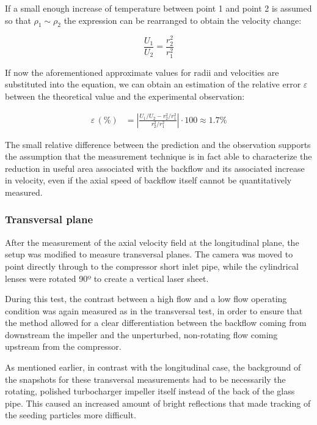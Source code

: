 If a small enough increase of temperature between point 1 and point 2 is assumed so that $\rho_1\sim\rho_2$ the expression can be rearranged to obtain the velocity change:

\begin{equation}
  \frac{U_1}{U_2} = \frac{r_2^2}{r_1^2}
\end{equation}

If now the aforementioned approximate values for radii and velocities are substituted into the equation, we can obtain an estimation of the relative error $\varepsilon$ between the theoretical value and the experimental observation:

\begin{align}
  \varepsilon\, (\%) &= \left|\frac{U_1/U_2-r_2^2/r_1^2}{r_2^2/r_1^2}\right| \cdot 100 \approx 1.7\%
\end{align}

The small relative difference between the prediction and the observation supports the assumption that the measurement technique is in fact able to characterize the reduction in useful area associated with the backflow and its associated increase in velocity, even if the axial speed of backflow itself cannot be quantitatively measured.

\subsubsection{Transversal plane}

After the measurement of the axial velocity field at the longitudinal plane, the setup was modified to measure transversal planes. The camera was moved to point directly through to the compressor short inlet pipe, while the cylindrical lenses were rotated 90º to create a vertical laser sheet.

During this test, the contrast between a high flow and a low flow operating condition was again measured as in the transversal test, in order to ensure that the method allowed for a clear differentiation between the backflow coming from downstream the impeller and the unperturbed, non-rotating flow coming upstream from the compressor.

As mentioned earlier, in contrast with the longitudinal case, the background of the snapshots for these transversal measurements had to be necessarily the rotating, polished turbocharger impeller itself instead of the back of the glass pipe. This caused an increased amount of bright reflections that made tracking of the seeding particles more difficult.

